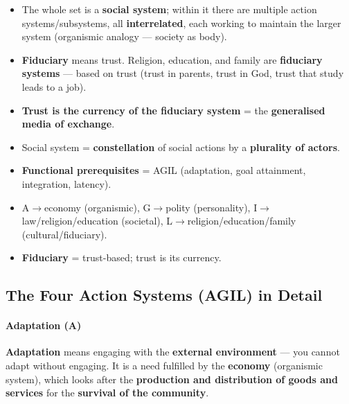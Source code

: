 \begin{CriticalPoint}
\begin{itemize}
\item The whole set is a \textbf{social system}; within it there are multiple action systems/subsystems, all \textbf{interrelated}, each working to maintain the larger system (organismic analogy --- society as body).
\end{itemize}
\end{CriticalPoint}

\begin{KeyConcept}
\begin{itemize}
\item \textbf{Fiduciary} means trust. Religion, education, and family are \textbf{fiduciary systems} --- based on trust (trust in parents, trust in God, trust that study leads to a job).
\item \textbf{Trust is the currency of the fiduciary system} = the \textbf{generalised media of exchange}.
\end{itemize}
\end{KeyConcept}

\begin{QuickRevision}
\begin{itemize}
\item Social system = \textbf{constellation} of social actions by a \textbf{plurality of actors}.
\item \textbf{Functional prerequisites} = AGIL (adaptation, goal attainment, integration, latency).
\item A$\rightarrow$economy (organismic), G$\rightarrow$polity (personality), I$\rightarrow$law/religion/education (societal), L$\rightarrow$religion/education/family (cultural/fiduciary).
\item \textbf{Fiduciary} = trust-based; trust is its currency.
\end{itemize}
\end{QuickRevision}

\sectiondivider

\subsection{The Four Action Systems (AGIL) in Detail}

\paragraph{Adaptation (A)}
\textbf{Adaptation} means engaging with the \textbf{external environment} --- you cannot adapt without engaging. It is a need fulfilled by the \textbf{economy} (organismic system), which looks after the \textbf{production and distribution of goods and services} for the \textbf{survival of the community}.

